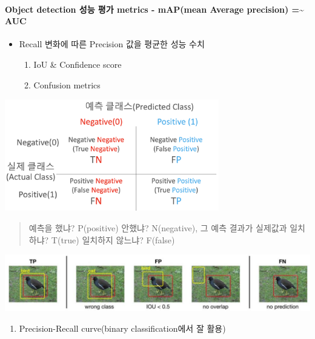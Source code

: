 \documentclass[
]{article}
\providecommand{\tightlist}{%
  \setlength{\itemsep}{0pt}\setlength{\parskip}{0pt}}
\begin{document}
\hypertarget{object-detection-uxc131uxb2a5-uxd3c9uxac00-metrics---mapmean-average-precision-auc}{%
\paragraph{Object detection 성능 평가 metrics - mAP(mean Average
precision) =\textasciitilde{}
AUC}\label{object-detection-uxc131uxb2a5-uxd3c9uxac00-metrics---mapmean-average-precision-auc}}

\begin{itemize}
\tightlist
\item
  Recall 변화에 따른 Precision 값을 평균한 성능 수치

  \begin{enumerate}
  \def\labelenumi{\arabic{enumi}.}
  \tightlist
  \item
    IoU \& Confidence score
  \item
    Confusion metrics
  \end{enumerate}
\end{itemize}

\includegraphics[width=0.7\textwidth,height=\textheight]{figs/Chapter1-5.png}

\begin{quote}
예측을 했냐? P(positive) 안했냐? N(negative), 그 예측 결과가 실제값과
일치하냐? T(true) 일치하지 않느냐? F(false)
\end{quote}

\includegraphics{figs/Chapter1-6.png}

\begin{enumerate}
\def\labelenumi{\arabic{enumi}.}
\setcounter{enumi}{2}
\tightlist
\item
  Precision-Recall curve(binary classification에서 잘 활용)
\end{enumerate}
\end{document}
